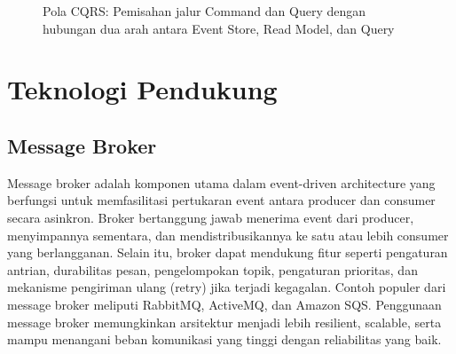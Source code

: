 \begin{figure}[h]
	\centering
	\caption{Pola CQRS: Pemisahan jalur Command dan Query dengan hubungan dua arah antara Event Store, Read Model, dan Query}
	\label{fig:cqrs}
\end{figure}




\section{Teknologi Pendukung}

\subsection{Message Broker}
Message broker adalah komponen utama dalam event-driven architecture yang berfungsi untuk memfasilitasi pertukaran event antara producer dan consumer secara asinkron. Broker bertanggung jawab menerima event dari producer, menyimpannya sementara, dan mendistribusikannya ke satu atau lebih consumer yang berlangganan. Selain itu, broker dapat mendukung fitur seperti pengaturan antrian, durabilitas pesan, pengelompokan topik, pengaturan prioritas, dan mekanisme pengiriman ulang (retry) jika terjadi kegagalan. Contoh populer dari message broker meliputi RabbitMQ, ActiveMQ, dan Amazon SQS. Penggunaan message broker memungkinkan arsitektur menjadi lebih resilient, scalable, serta mampu menangani beban komunikasi yang tinggi dengan reliabilitas yang baik.

